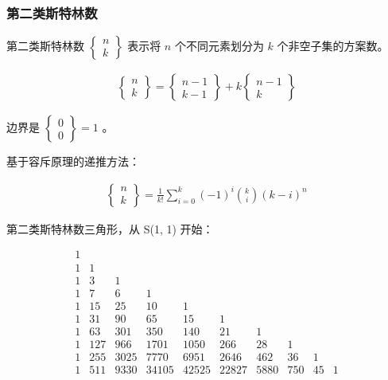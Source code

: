 \documentclass{article}
\begin{document}
\subsubsection{第二类斯特林数}

第二类斯特林数 $\begin{Bmatrix} n\\k \end{Bmatrix}$ 表示将 $n$ 个不同元素划分为 $k$ 个非空子集的方案数。

$$
\begin{aligned}
\begin{Bmatrix} n\\k \end{Bmatrix}
=
\begin{Bmatrix} n-1\\k-1 \end{Bmatrix}
+
k\begin{Bmatrix} n-1\\k \end{Bmatrix}
\end{aligned}
$$

边界是 $\begin{Bmatrix}0\\0\end{Bmatrix}=1$ 。

基于容斥原理的递推方法：

$$
\begin{aligned}
\begin{Bmatrix} n\\k \end{Bmatrix} =
\frac{1}{k!}\sum^k_{i=0}(-1)^i\binom{k}{i}(k-i)^n
\end{aligned}
$$

第二类斯特林数三角形，从 S(1, 1) 开始：

$$
\begin{matrix}
1 \\
1 & 1 \\
1 & 3 & 1 \\
1 & 7 & 6 & 1 \\
1 & 15 & 25 & 10 & 1 \\
1 & 31 & 90 & 65 & 15 & 1 \\
1 & 63 & 301 & 350 & 140 & 21 & 1 \\
1 & 127 & 966 & 1701 & 1050 & 266 & 28 & 1 \\
1 & 255 & 3025 & 7770 & 6951 & 2646 & 462 & 36 & 1 \\
1 & 511 & 9330 & 34105 & 42525 & 22827 & 5880 & 750 & 45 & 1 \\
\end{matrix}
$$
\end{document}
